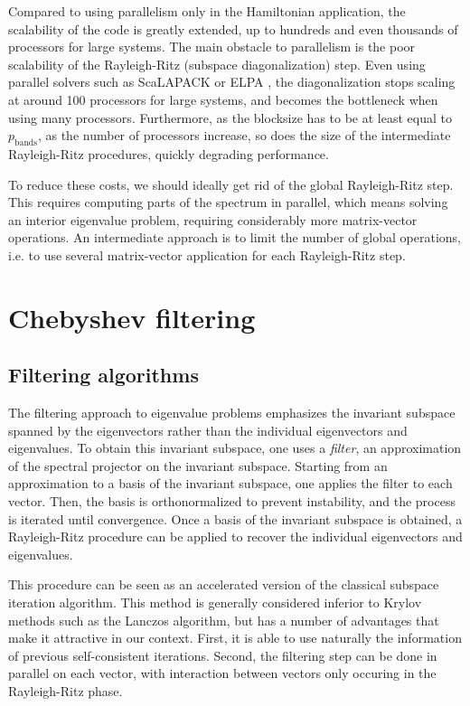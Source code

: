 \documentclass[11pt]{elsarticle}
\newcommand{\npband}{\ensuremath{p_{\text{bands}}}\xspace}
\begin{document}
Compared to using parallelism only in the Hamiltonian application, the
scalability of the code is greatly extended, up to hundreds and even
thousands of processors for large systems. The main obstacle to
parallelism is the poor scalability of the Rayleigh-Ritz (subspace
diagonalization) step. Even using parallel solvers such as ScaLAPACK
\cite{choi1992scalapack} or ELPA \cite{auckenthaler2011parallel}, the
diagonalization stops scaling at around 100 processors for large
systems, and becomes the bottleneck when using many
processors. Furthermore, as the blocksize has to be at least equal to
\npband, as the number of processors increase, so does the size of the
intermediate Rayleigh-Ritz procedures, quickly degrading performance.

To reduce these costs, we should ideally get rid of the global
Rayleigh-Ritz step. This requires computing parts of the spectrum in
parallel, which means solving an interior eigenvalue problem,
requiring considerably more matrix-vector operations. An intermediate
approach is to limit the number of global operations, i.e. to use
several matrix-vector application for each Rayleigh-Ritz step.

\section{Chebyshev filtering}
\subsection{Filtering algorithms}
The filtering approach to eigenvalue problems emphasizes the invariant
subspace spanned by the eigenvectors rather than the individual
eigenvectors and eigenvalues. To obtain this invariant subspace, one
uses a \textit{filter}, an approximation of the spectral projector on
the invariant subspace. Starting from an approximation to a basis of
the invariant subspace, one applies the filter to each vector. Then,
the basis is orthonormalized to prevent instability, and the process
is iterated until convergence. Once a basis of the invariant subspace is
obtained, a Rayleigh-Ritz procedure can be applied to recover the
individual eigenvectors and eigenvalues.

This procedure can be seen as an accelerated version of the classical
subspace iteration algorithm. This method is generally considered
inferior to Krylov methods such as the Lanczos algorithm, but has a
number of advantages that make it attractive in our context. First, it
is able to use naturally the information of previous self-consistent
iterations. Second, the filtering step can be done in parallel on each
vector, with interaction between vectors only occuring in the Rayleigh-Ritz
phase.
\end{document}

